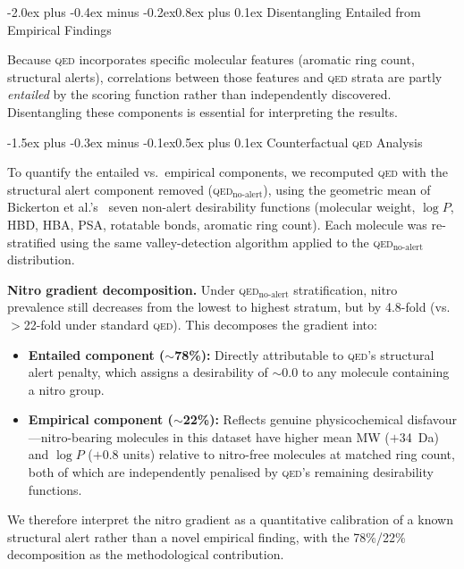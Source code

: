 \documentclass[10pt,a4paper,twocolumn]{article}
\makeatletter
\providecommand{\qed}{}
\let\qed\relax
\newcommand{\qedscore}{\textsc{qed}}
\let\qed\qedscore
\newcommand{\logp}{\ensuremath{\log P}}
\renewcommand\subsection{\@startsection{subsection}{2}{\z@}%
  {-2.0ex plus -0.4ex minus -0.2ex}{0.8ex plus 0.1ex}%
  {\normalfont\large\bfseries}}
\renewcommand\subsubsection{\@startsection{subsubsection}{3}{\z@}%
  {-1.5ex plus -0.3ex minus -0.1ex}{0.5ex plus 0.1ex}%
  {\normalfont\normalsize\bfseries}}
\makeatother
\begin{document}
\subsection{Disentangling Entailed from Empirical Findings}
\label{sec:nitro-circularity}

Because \qed{} incorporates specific molecular features (aromatic ring count, structural alerts), correlations between those features and \qed{} strata are partly \emph{entailed} by the scoring function rather than independently discovered. Disentangling these components is essential for interpreting the results.

\subsubsection{Counterfactual \qed{} Analysis}

To quantify the entailed vs.\ empirical components, we recomputed \qed{} with the structural alert component removed (\qed{}$_{\mathrm{no\text{-}alert}}$), using the geometric mean of Bickerton et al.'s~\cite{bickerton2012} seven non-alert desirability functions (molecular weight, $\logp{}$, HBD, HBA, PSA, rotatable bonds, aromatic ring count). Each molecule was re-stratified using the same valley-detection algorithm applied to the \qed{}$_{\mathrm{no\text{-}alert}}$ distribution.

\textbf{Nitro gradient decomposition.} Under \qed{}$_{\mathrm{no\text{-}alert}}$ stratification, nitro prevalence still decreases from the lowest to highest stratum, but by 4.8-fold (vs.\ $>$22-fold under standard \qed{}). This decomposes the gradient into:
\begin{itemize}[nosep]
    \item \textbf{Entailed component ($\sim$78\%):} Directly attributable to \qed{}'s structural alert penalty, which assigns a desirability of ${\sim}0.0$ to any molecule containing a nitro group.
    \item \textbf{Empirical component ($\sim$22\%):} Reflects genuine physicochemical disfavour---nitro-bearing molecules in this dataset have higher mean MW ($+$34~Da) and $\logp{}$ ($+$0.8 units) relative to nitro-free molecules at matched ring count, both of which are independently penalised by \qed{}'s remaining desirability functions.
\end{itemize}

\noindent We therefore interpret the nitro gradient as a quantitative calibration of a known structural alert rather than a novel empirical finding, with the 78\%/22\% decomposition as the methodological contribution.
\end{document}
